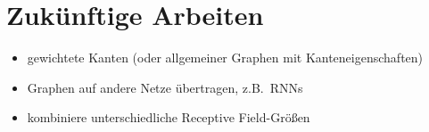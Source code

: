 \section{Zukünftige Arbeiten}

\begin{itemize}
  \item gewichtete Kanten (oder allgemeiner Graphen mit Kanteneigenschaften)
  \item Graphen auf andere Netze übertragen, z.B.\ RNNs
  \item kombiniere unterschiedliche Receptive Field-Größen
\end{itemize}
